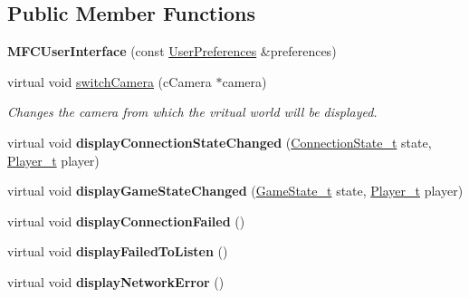 \subsection*{Public Member Functions}
\begin{DoxyCompactItemize}
\item 
\hypertarget{classMFCUserInterface_a7ac72f8cddb94419db9c9ed261ace1b1}{
{\bfseries MFCUserInterface} (const \hyperlink{structUserPreferences}{UserPreferences} \&preferences)}
\label{classMFCUserInterface_a7ac72f8cddb94419db9c9ed261ace1b1}

\item 
virtual void \hyperlink{classMFCUserInterface_aad532c59dfe347b8a69f92b5b6ee7563}{switchCamera} (cCamera $\ast$camera)
\begin{DoxyCompactList}\small\item\em Changes the camera from which the vritual world will be displayed. \item\end{DoxyCompactList}\item 
\hypertarget{classMFCUserInterface_affc39ae32cd234575ce95db40701db01}{
virtual void {\bfseries displayConnectionStateChanged} (\hyperlink{namespaceConnectionState_ad1b6674b6f1c58f17e9db75d0a77149f}{ConnectionState\_\-t} state, \hyperlink{namespacePlayer_acc4ced29e6b7e20f602b3c8b60c75228}{Player\_\-t} player)}
\label{classMFCUserInterface_affc39ae32cd234575ce95db40701db01}

\item 
\hypertarget{classMFCUserInterface_a5cf1751505da89dc55df1fb12318bd96}{
virtual void {\bfseries displayGameStateChanged} (\hyperlink{namespaceGameState_a1026e99904938017415f188e2daba514}{GameState\_\-t} state, \hyperlink{namespacePlayer_acc4ced29e6b7e20f602b3c8b60c75228}{Player\_\-t} player)}
\label{classMFCUserInterface_a5cf1751505da89dc55df1fb12318bd96}

\item 
\hypertarget{classMFCUserInterface_a1eb12e6f9b8729361008d9abd290d245}{
virtual void {\bfseries displayConnectionFailed} ()}
\label{classMFCUserInterface_a1eb12e6f9b8729361008d9abd290d245}

\item 
\hypertarget{classMFCUserInterface_a1ad6e96350df96d07b0f4de186c1677c}{
virtual void {\bfseries displayFailedToListen} ()}
\label{classMFCUserInterface_a1ad6e96350df96d07b0f4de186c1677c}

\item 
\hypertarget{classMFCUserInterface_a12aafbe2449d1eff42150b84e2b403b2}{
virtual void {\bfseries displayNetworkError} ()}
\label{classMFCUserInterface_a12aafbe2449d1eff42150b84e2b403b2}


\end{DoxyCompactItemize}
